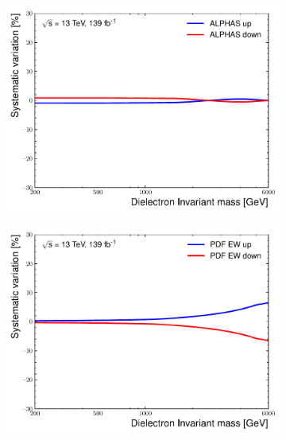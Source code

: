 \begin{figure}[h!]
\begin{subfigure}[h]{0.42\textwidth}
        \caption{}
        \label{fig:uncert:mmEW}
    \end{subfigure}
    \begin{subfigure}[h]{0.42\textwidth}
        \includegraphics[width=\textwidth]{figures/analysis/datamc/Uncertainties/theory/ee/backgroundTemplate_KF_ALPHAS__1up.pdf}
        \caption{}
        \label{fig:uncert:eealpha}
    \end{subfigure}
    \begin{subfigure}[h]{0.42\textwidth}
        \centering
        \includegraphics[width=\textwidth]{figures/analysis/datamc/Uncertainties/theory/ee/backgroundTemplate_KF_PDF_EW__1up.pdf}

\end{subfigure}
\end{figure}
